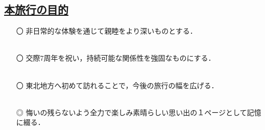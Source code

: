 \begin{center}
	\section*{\underline{\fontsize{45pt}{20pt}\selectfont 本旅行の目的}}
\end{center}
\vspace{1.5cm}

\begin{itemize}
	\item[〇] 非日常的な体験を通じて親睦をより深いものとする．\\\\
	\item[〇] 交際7周年を祝い，持続可能な関係性を強固なものにする．\\\\
	\item[〇] 東北地方へ初めて訪れることで，今後の旅行の幅を広げる．\\\\
	\item[◎] 悔いの残らないよう全力で楽しみ素晴らしい思い出の１ページとして記憶に綴る．\\\\
\end{itemize}



